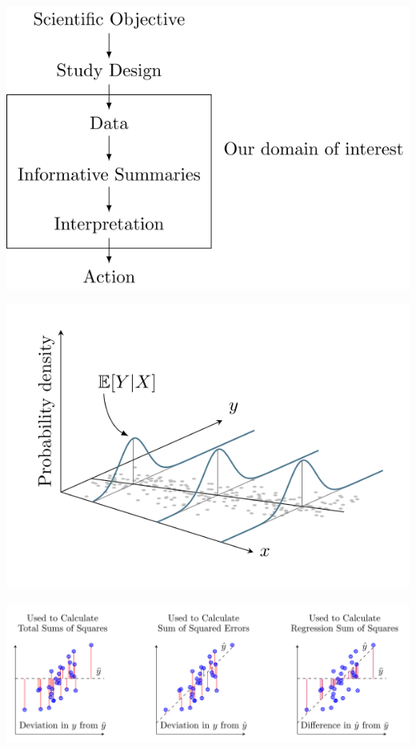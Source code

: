 \documentclass[
  letterpaper,
  DIV=11,
  numbers=noendperiod]{scrreport}
\begin{document}
\includegraphics[width=1\textwidth,height=\textheight]{./week1/standalone_figures/scientific_process/scientific_process.svg}

\includegraphics[width=1\textwidth,height=\textheight]{./week2/standalone_figures/pr_density_of_linear_model/pr_density_of_linear_model.svg}

\includegraphics[width=1\textwidth,height=\textheight]{./week3/standalone_figures/residual_decompositions/residual_decomposition.svg}
\end{document}
